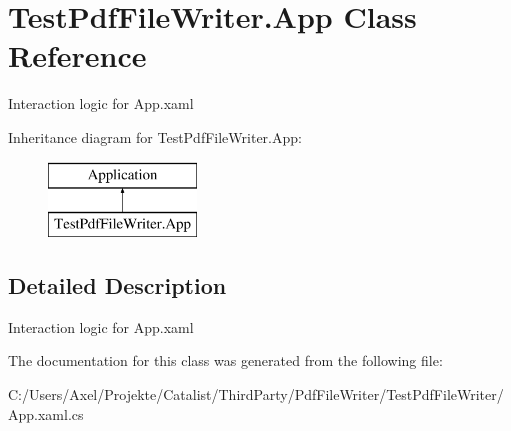 \hypertarget{class_test_pdf_file_writer_1_1_app}{}\section{Test\+Pdf\+File\+Writer.\+App Class Reference}
\label{class_test_pdf_file_writer_1_1_app}


Interaction logic for App.\+xaml  


Inheritance diagram for Test\+Pdf\+File\+Writer.\+App\+:\begin{figure}[H]
\begin{center}
\leavevmode
\includegraphics[height=2.000000cm]{class_test_pdf_file_writer_1_1_app}
\end{center}
\end{figure}


\subsection{Detailed Description}
Interaction logic for App.\+xaml 



The documentation for this class was generated from the following file\+:\begin{DoxyCompactItemize}
\item 
C\+:/\+Users/\+Axel/\+Projekte/\+Catalist/\+Third\+Party/\+Pdf\+File\+Writer/\+Test\+Pdf\+File\+Writer/App.\+xaml.\+cs\end{DoxyCompactItemize}
